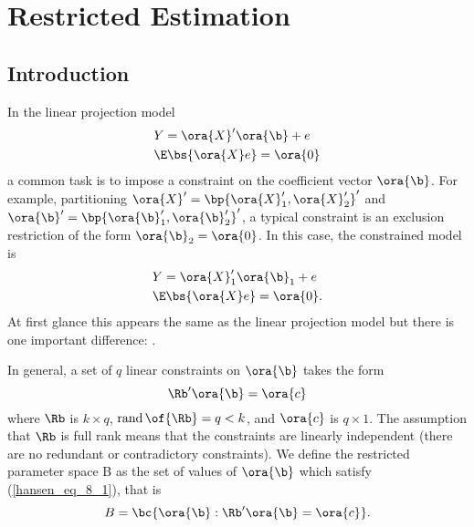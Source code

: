 
\chapter{Restricted Estimation}


\section{Introduction}

In the linear projection model 
\begin{equation}
    \notag
    \begin{aligned}
        & Y = \ora{X}^\prime \ora{\b} + e \\
        & \E\bs{\ora{X} e} = \ora{0}
    \end{aligned}
\end{equation}
a common task is to impose a constraint on the coefficient vector $\ora{\b}$. For example, partitioning $\ora{X}^\prime = \bp{\ora{X}_1^\prime, \ora{X}_2^\prime}^\prime$ and $\ora{\b}^\prime = \bp{\ora{\b}_1^\prime, \ora{\b}_2^\prime}^\prime$, a typical constraint is an exclusion restriction of the form $\ora{\b}_2 = \ora{0}$. In this case, the constrained model is 
\begin{equation}
    \notag
    \begin{aligned}
        & Y = \ora{X}_1^\prime \ora{\b}_1 + e \\
        & \E\bs{\ora{X} e} = \ora{0}.
    \end{aligned}
\end{equation}
At first glance this appears the same as the linear projection model but there is one important difference: .

In general, a set of $q$ linear constraints on $\ora{\b}$ takes the form 
\begin{equation}
    \label{hansen_eq_8_1}
    \Rb^\prime \ora{\b} = \ora{c}
\end{equation}
where $\Rb$ is $k \times q$, $\operatorname*{rand}\of{\Rb} = q < k$, and $\ora{c}$ is $q \times 1$. The assumption that $\Rb$ is full rank means that the constraints are linearly independent (there are no redundant or contradictory constraints). We define the restricted parameter space B as the set of values of $\ora{\b}$ which satisfy (\ref{hansen_eq_8_1}), that is
\begin{equation}
    \notag
    B = \bc{\ora{\b}: \Rb^\prime \ora{\b} = \ora{c}}.
\end{equation}

